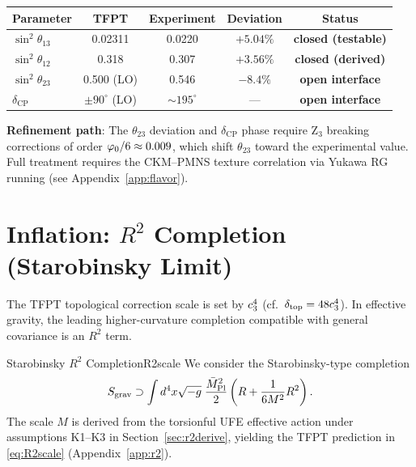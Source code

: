 \begin{tcolorbox}[colback=blue!3, colframe=blue!50!black, 
    title={\textbf{PMNS: closed sub-block vs.\ open interface}}, fonttitle=\bfseries]
\begin{center}
\begin{tabular}{@{}lcccc@{}}
\toprule
\textbf{Parameter} & \textbf{TFPT} & \textbf{Experiment} & \textbf{Deviation} & \textbf{Status}\\
\midrule
$\sin^2\theta_{13}$ & 0.02311 & 0.0220 & $+5.04\%$ & \textbf{closed (testable)}\\
$\sin^2\theta_{12}$ & 0.318 & 0.307 & $+3.56\%$ & \textbf{closed (derived)}\\
$\sin^2\theta_{23}$ & 0.500 (LO) & 0.546 & $-8.4\%$ & \textbf{open interface}\\
$\delta_{\text{CP}}$ & $\pm 90^\circ$ (LO) & $\sim 195^\circ$ & --- & \textbf{open interface}\\
\bottomrule
\end{tabular}
\end{center}

\textbf{Refinement path}: The $\theta_{23}$ deviation and $\delta_{\mathrm{CP}}$ phase require 
Z$_3$ breaking corrections of order $\varphi_0/6 \approx 0.009$, which shift $\theta_{23}$ toward 
the experimental value. Full treatment requires the CKM--PMNS texture correlation via 
Yukawa RG running (see Appendix~\ref{app:flavor}).
\end{tcolorbox}

\TFPTZthreePermutationMatrix

\TFPTPMNSVariantTable

\section{\texorpdfstring{Inflation: $R^2$ Completion (Starobinsky Limit)}{Inflation: R2 Completion (Starobinsky Limit)}}

The TFPT topological correction scale is set by $c_3^4$ (cf.\ $\delta_{\mathrm{top}} = 48c_3^4$). 
In effective gravity, the leading higher-curvature completion compatible with general covariance is an $R^2$ term.

\begin{definition}{Starobinsky $R^2$ Completion}{R2scale}
We consider the Starobinsky-type completion
\begin{equation}
    S_{\text{grav}} \supset \int d^4x\sqrt{-g}\;\frac{\bar{M}_{\mathrm{Pl}}^2}{2}\left(R + \frac{1}{6M^2}R^2\right).
    \label{eq:R2action}
\end{equation}
The scale $M$ is derived from the torsionful UFE effective action under
assumptions K1--K3 in Section~\ref{sec:r2derive}, yielding the TFPT prediction in
\eqref{eq:R2scale} (Appendix~\ref{app:r2}).
\end{definition}

